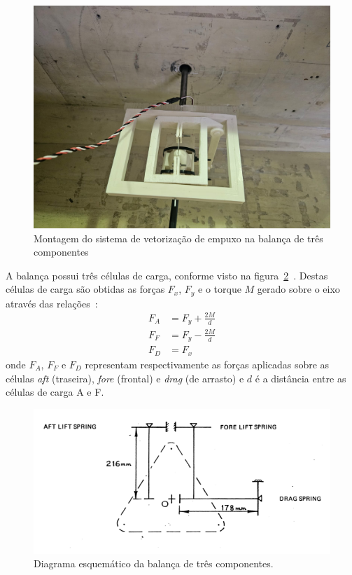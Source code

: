 \begin{figure}[htbp]
    \centering
    \includegraphics[height=0.45\textheight]{img/montagem_interna.jpeg}
    \caption{Montagem do sistema de vetorização de empuxo na balança de três componentes}\label{fig:montagem_interna}
\end{figure}

A balança possui três células de carga, conforme visto na figura~\ref{fig:scale_diagram}~\cite{lab}. Destas células de carga são obtidas as forças \(F_x\), \(F_y\) e o torque \(M\) gerado sobre o eixo através das relações~\cite{lab}:
\begin{align}
    F_A &= F_y + \frac{2M}{d} \label{eq:FA}\\
    F_F &= F_y - \frac{2M}{d} \label{eq:FF}\\
    F_D &= F_x \label{eq:FD}
\end{align}
onde \(F_A\), \(F_F\) e \(F_D\) representam respectivamente as forças aplicadas sobre as células \textit{aft} (traseira), \textit{fore} (frontal) e \textit{drag} (de arrasto) e \(d\) é a distância entre as células de carga A e F. 

\begin{figure}[htbp]
    \centering
    \includegraphics[width=\textwidth]{img/three_axis_scale_diagram.png}
    \caption{Diagrama esquemático da balança de três componentes.}
    \label{fig:scale_diagram}
\end{figure}

